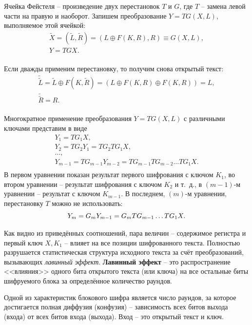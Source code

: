 Ячейка Фейстеля -- произведение двух перестановок $T$ и $G$, где $T$ -- замена левой части на правую и наоборот. Запишем преобразование $Y=TG(X,L)$, выполняемое этой ячейкой:
\[
  \begin{array}{l}
    \tilde{X} = (\tilde{L}, \tilde{R}) = (L \oplus F(K,R), R) \equiv G(X, L), \\
    Y = TGX. \\
  \end{array}
\]

Если дважды применим перестановку, то получим снова открытый текст:
\[
    \begin{array}{l}
        \tilde{\tilde{L}} = \tilde{L} \oplus F(K, \tilde{R}) = (L \oplus F(K,R) \oplus F(K,R)) = L, \\
        \tilde{\tilde{R}} = R.\\
    \end{array}
\]

Многократное применение преобразования $Y=TG(X,L)$ с различными ключами представим в виде
\[
  \begin{array}{l}
    Y_1 = T G_1 X,\\
    Y_2 = T G_2 Y_1 = T G_2 T G_1 X, \\
    \ldots, \\
    Y_{m-1} = T G_{m-1} Y_{m-2} = T G_{m-1} T G_{m-2} \ldots T G_1 X.\\
  \end{array}
\]
В первом уравнении показан результат первого шифрования с ключом $K_{1}$, во втором уравнении -- результат шифрования с ключом $K_{2}$ и т.~д., в $(m-1)$-м уравнении -- результат с ключом $K_{m-1}$. В последнем, $(m)$-м уравнении, перестановку $T$ можно не использовать:
\[
   Y_{m}= G_{m} Y_{m-1} = G_{m} T G_{m-1} \ldots T G_{1} X.\\
\]

Как видно из приведённых соотношений, пара величин -- содержимое регистра и первый ключ $X, K_{1}$ -- влияет на все позиции шифрованного текста. Полностью разрушается статистическая структура исходного текста за счёт преобразований, вызывающих \emph{лавинный эффект}. \textbf{Лавинный эффект} -- это распространение <<влияния>> одного бита открытого текста (или ключа) на все остальные биты шифруемого блока за определённое количество раундов.

Одной из характеристик блокового шифра является число раундов, за которое достигается полная диффузия (конфузия) -- зависимость всех битов выхода (входа) от всех битов входа (выхода). Вход -- это открытый текст и ключ.

